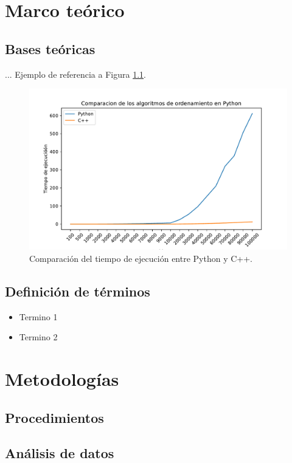 \documentclass[12pt]{report}
\begin{document}
\chapter{Marco teórico}
\section{Bases teóricas}

... Ejemplo de referencia a Figura \ref{Figura_diferencias_AI_DS_ML}.
\begin{figure}[H]
\centering
\includegraphics[width=6in]{countingSort.pdf}
\caption{Comparación del tiempo de ejecución entre Python y C++.}%
\label{Figura_diferencias_AI_DS_ML}
\end{figure}

\section{Definición de términos}
\begin{itemize}
    \item Termino 1\\
    \item Termino 2\\
\end{itemize}

\chapter{Metodologías}
\section{Procedimientos}


\section{Análisis de datos}
\end{document}
